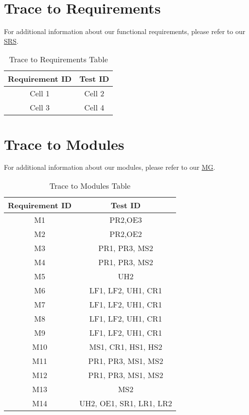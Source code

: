 \documentclass[12pt, titlepage]{article}
\begin{document}
\section{Trace to Requirements}
  For additional information about our functional requirements, please refer to our \href{https://github.com/RezaJodeiri/CXR-Capstone/blob/main/docs/SRS/SRS.pdf}{SRS}.
  \begin{table}[h!]
  \centering
  \begin{tabular}{|c|c|}
  \hline
  \textbf{Requirement ID} & \textbf{Test ID} \\ \hline
  Cell 1            & Cell 2            \\ \hline
  Cell 3            & Cell 4            \\ \hline
  \end{tabular}
  \caption{Trace to Requirements Table} 
  \label{tab:2by2}
  \end{table}
\section{Trace to Modules}	
For additional information about our modules, please refer to our \href{https://github.com/RezaJodeiri/CXR-Capstone/blob/main/docs/Design/SoftArchitecture/MG.pdf}{MG}.	
\begin{table}[h!]
  \centering
  \begin{tabular}{|c|c|}
  \hline
  \textbf{Requirement ID} & \textbf{Test ID} \\ \hline
  M1           & PR2,OE3            \\ \hline
  M2           & PR2,OE2            \\ \hline
  M3           & PR1, PR3, MS2      \\ \hline
  M4           & PR1, PR3, MS2      \\ \hline
  M5           & UH2                \\ \hline
  M6           & LF1, LF2, UH1, CR1 \\ \hline
  M7           & LF1, LF2, UH1, CR1 \\ \hline
  M8           & LF1, LF2, UH1, CR1 \\ \hline
  M9           & LF1, LF2, UH1, CR1 \\ \hline
  M10          & MS1, CR1, HS1, HS2 \\ \hline
  M11          & PR1, PR3, MS1, MS2 \\ \hline
  M12          & PR1, PR3, MS1, MS2 \\ \hline
  M13          & MS2                \\ \hline
  M14          & UH2, OE1, SR1, LR1, LR2 \\ \hline
  \end{tabular}
  \caption{Trace to Modules Table} 
  \end{table}
\end{document}
